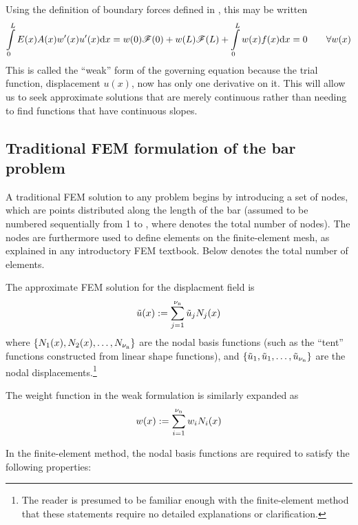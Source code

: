 Using the definition of boundary forces defined in , this may be written
\begin{equation}
 \int\limits_0^L E(x)A(x) w'(x)u'(x)\mathrm{d} x = w(0)\mathscr{F}(0)+w(L)\mathscr{F}(L)  +  \int\limits_0^L w(x)f(x)\mathrm{d} x=0
\qquad\forall w(x)
\label{eq:LinearBarWeakFormWithForcesc}
\end{equation}
This is called the ``weak'' form of the governing equation because the trial function, displacement $u(x)$, now has only one derivative on it. This will allow us to seek approximate solutions that are merely continuous rather than needing to find functions that have continuous slopes.




\subsection{Traditional FEM formulation of the bar problem}
\label{sec:LinearBarFEM}
A traditional FEM solution to any \oneD problem begins by introducing a set of nodes, which are points distributed along the length of the bar (assumed to be numbered sequentially from 1 to \numnodes, where \numnodes denotes the total number of nodes).  The nodes are furthermore used to define elements on the finite-element mesh, as explained in any introductory FEM textbook.  Below \numelements denotes the total number of elements.
 
The approximate FEM solution for the displacment field is
\begin{equation}
  \tilde{u}(x):=\sum\limits_{j=1}^{{\nu_\text{n}}}\tilde{u}_j {N}_j(x)
\label{eq:aprxuc}
\end{equation}
where $\{{N}_1(x),{N}_2(x),\ldots,{N}_{\nu_\text{n}}\}$ are the nodal basis functions (such as the ``tent'' functions constructed from linear shape functions), and $\{\tilde{u}_1, \tilde{u}_1, \ldots, \tilde{u}_{\nu_\text{n}}\}$  
are the nodal displacements.\footnote{The reader is presumed to be familiar enough with the finite-element method that these statements require no detailed explanations or clarification.}

The weight function in the weak formulation is similarly expanded as
\begin{equation}
  w(x):=\sum\limits_{i=1}^{{\nu_\text{n}}}w_i {N}_i(x)
\label{eq:weightc}
\end{equation}

In the finite-element method, the nodal basis functions are required to satisfy the following properties:

